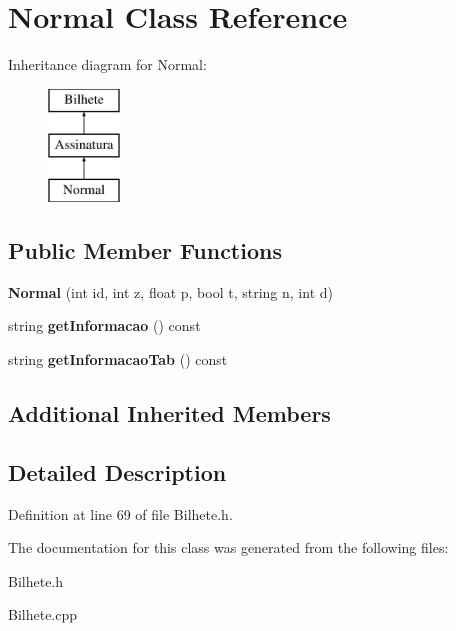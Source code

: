 \hypertarget{classNormal}{}\section{Normal Class Reference}
\label{classNormal}
Inheritance diagram for Normal\+:\begin{figure}[H]
\begin{center}
\leavevmode
\includegraphics[height=3.000000cm]{classNormal}
\end{center}
\end{figure}
\subsection*{Public Member Functions}
\begin{DoxyCompactItemize}
\item 
\mbox{\label{classNormal_a8594a10a566718bc2259a22fdc34836c}} 
{\bfseries Normal} (int id, int z, float p, bool t, string n, int d)
\item 
\mbox{\label{classNormal_a1606365cea9b43c524543572bee2d38c}} 
string {\bfseries get\+Informacao} () const
\item 
\mbox{\label{classNormal_a506d3d9d214e6849b05bffa90f5ccd9e}} 
string {\bfseries get\+Informacao\+Tab} () const
\end{DoxyCompactItemize}
\subsection*{Additional Inherited Members}


\subsection{Detailed Description}


Definition at line 69 of file Bilhete.\+h.



The documentation for this class was generated from the following files\+:\begin{DoxyCompactItemize}
\item 
Bilhete.\+h\item 
Bilhete.\+cpp\end{DoxyCompactItemize}
